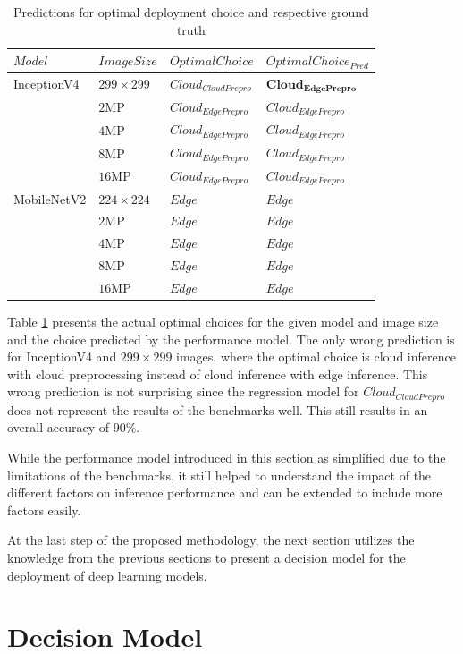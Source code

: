 \begin{table}[!htb]
\centering
\caption{Predictions for optimal deployment choice and respective ground truth}
\label{table:perfmofelpred}
\begin{tabular}{@{}llll@{}}
\toprule
$Model$ & $ImageSize$ & $OptimalChoice$ & $OptimalChoice_{Pred}$ \\ \midrule
InceptionV4 & $299\times299$ & $Cloud_{CloudPrepro}$ & $\mathbf{Cloud_{EdgePrepro}}$ \\
 & $2$MP & $Cloud_{EdgePrepro}$ & $Cloud_{EdgePrepro}$ \\
 & $4$MP & $Cloud_{EdgePrepro}$ & $Cloud_{EdgePrepro}$ \\
 & $8$MP & $Cloud_{EdgePrepro}$ & $Cloud_{EdgePrepro}$ \\
 & $16$MP & $Cloud_{EdgePrepro}$ & $Cloud_{EdgePrepro}$ \\
MobileNetV2 & $224\times224$ & $Edge$ & $Edge$ \\
 & $2$MP & $Edge$ & $Edge$ \\
 & $4$MP & $Edge$ & $Edge$ \\
 & $8$MP & $Edge$ & $Edge$ \\ 
 & $16$MP & $Edge$ & $Edge$ \\ \bottomrule
\end{tabular}
\end{table}


Table \ref{table:perfmofelpred} presents the actual optimal choices for the given model and image size and the choice predicted by the performance model.
The only wrong prediction is for InceptionV4 and $299\times299$ images, where the optimal choice is cloud inference with cloud preprocessing instead of cloud inference with edge inference.
This wrong prediction is not surprising since the regression model for $Cloud_{CloudPrepro}$ does not represent the results of the benchmarks well.
This still results in an overall accuracy of $90\%$.


While the performance model introduced in this section as simplified due to the limitations of the benchmarks, it still helped to understand the impact of the different factors on inference performance and can be extended to include more factors easily.

At the last step of the proposed methodology, the next section utilizes the knowledge from the previous sections to present a decision model for the deployment of deep learning models.


\FloatBarrier
\section{Decision Model}\label{chap:DecisionModel}

